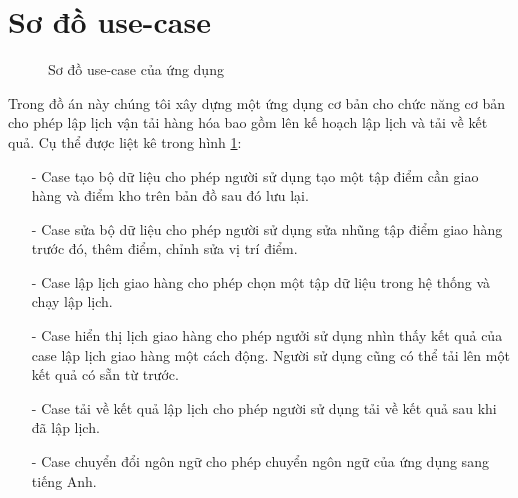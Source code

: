 \documentclass[a4paper,12pt]{report}
\begin{document}
\section{Sơ đồ use-case}
\begin{figure}[H]

\begin{center}
\end{center}
\caption{Sơ đồ use-case của ứng dụng}
\label{usecase}

\end{figure}
Trong đồ án này chúng tôi xây dựng một ứng dụng cơ bản cho chức năng cơ bản cho phép lập lịch vận tải hàng hóa bao gồm lên kế hoạch lập lịch và tải về kết quả. Cụ thể được liệt kê trong hình \ref{usecase}:
\begin{itemize}
\item[-] Case tạo bộ dữ liệu cho phép người sử dụng tạo một tập điểm cần giao hàng và điểm kho trên bản đồ sau đó lưu lại.
\item[-] Case sửa bộ dữ liệu cho phép người sử dụng sửa nhũng tập điểm giao hàng trước đó, thêm điểm, chỉnh sửa vị trí điểm.
\item[-] Case lập lịch giao  hàng cho phép chọn một tập dữ liệu trong hệ thống và chạy lập lịch.
\item[-] Case hiển thị lịch giao hàng cho phép ngưởi sử dụng nhìn thấy kết quả của case lập lịch giao hàng một cách động. Người sử dụng cũng có thể tải lên một kết quả có sẵn từ trước.
\item[-] Case tải về kết quả lập lịch cho phép người sử dụng tải về kết quả sau khi đã lập lịch. 
\item[-] Case chuyển đổi ngôn ngữ cho phép chuyển ngôn ngữ của ứng dụng sang tiếng Anh.
\end{itemize}
\end{document}
